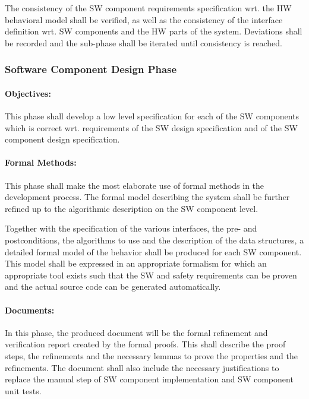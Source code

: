 The consistency of the SW component requirements specification wrt. the HW
behavioral model shall be verified, as well as the consistency of the interface
definition wrt. SW components and the HW parts of the system. Deviations shall
be recorded and the sub-phase shall be iterated until consistency is reached.


\subsubsection{Software Component Design Phase}
\label{sec:softw-comp-design}

\paragraph{Objectives:}
\label{sec:sw-comp-objectives}
This phase shall develop a low level specification for each of
the SW components which is correct wrt. requirements of the SW design
specification and of the SW component design specification.

\paragraph{Formal Methods:}
\label{sec:sw-comp-formal-methods}
This phase shall make the most elaborate use of formal methods in the
development process. The formal model describing the system shall be further
refined up to the algorithmic description on the SW component level.

Together with the specification of the various interfaces, the pre- and
postconditions, the algorithms to use and the description of the data
structures, a detailed formal model of the behavior shall be produced for each
SW component. This model shall be expressed in an appropriate formalism for
which an appropriate tool exists such that the SW and safety requirements can be
proven and the actual source code can be generated automatically.

\paragraph{Documents:}
\label{sec:sw-comp-documents}
In this phase, the produced document will be the formal refinement and
verification report created by the formal proofs. This shall describe the proof
steps, the refinements and the necessary lemmas to prove the properties and the
refinements. The document shall also include the necessary justifications to
replace the manual step of SW component implementation and SW component unit
tests.


